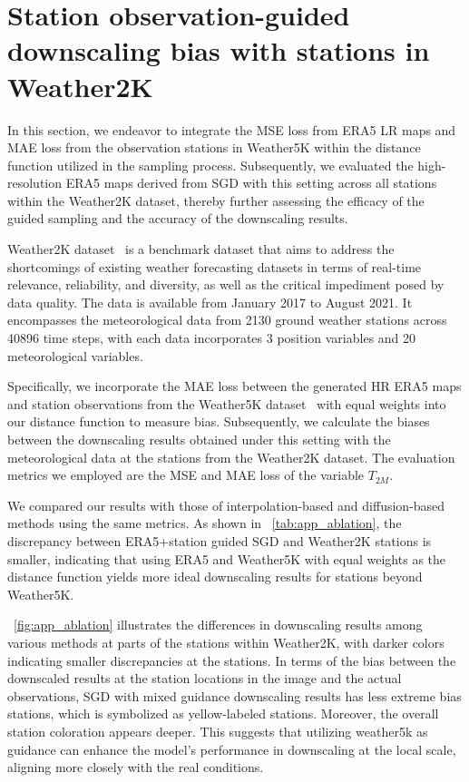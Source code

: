 \section{Station observation-guided downscaling bias with stations in Weather2K}
In this section, we endeavor to integrate the MSE loss from ERA5 LR maps and MAE loss from the observation stations in Weather5K within the distance function utilized in the sampling process. 
Subsequently, we evaluated the high-resolution ERA5 maps derived from SGD with this setting across all stations within the Weather2K dataset, thereby further assessing the efficacy of the guided sampling and the accuracy of the downscaling results. 

Weather2K dataset~\cite{zhu2023weather2k} is a benchmark dataset that aims to address the shortcomings of existing weather forecasting datasets in terms of real-time relevance, reliability, and diversity, as well as the critical impediment posed by data quality. 
The data is available from January 2017 to August 2021. 
It encompasses the meteorological data from 2130 ground weather stations across 40896 time steps, with each data incorporates 3 position variables and 20 meteorological variables. 

Specifically, we incorporate the MAE loss between the generated HR ERA5 maps and station observations from the Weather5K dataset~\cite{han2024weather} with equal weights into our distance function to measure bias. 
Subsequently, we calculate the biases between the downscaling results obtained under this setting with the meteorological data at the stations from the Weather2K dataset. 
The evaluation metrics we employed are the MSE and MAE loss of the variable $T_{2M}$. 

We compared our results with those of interpolation-based and diffusion-based methods using the same metrics. 
As shown in ~\cref{tab:app_ablation}, the discrepancy between ERA5+station guided SGD and Weather2K stations is smaller, indicating that using ERA5 and Weather5K with equal weights as the distance function yields more ideal downscaling results for stations beyond Weather5K. 

~\cref{fig:app_ablation} illustrates the differences in downscaling results among various methods at parts of the stations within Weather2K, with darker colors indicating smaller discrepancies at the stations. 
In terms of the bias between the downscaled results at the station locations in the image and the actual observations,  SGD with mixed guidance downscaling results has less extreme bias stations, which is symbolized as yellow-labeled stations. 
Moreover, the overall station coloration appears deeper. 
This suggests that utilizing weather5k as guidance can enhance the model's performance in downscaling at the local scale, aligning more closely with the real conditions. 


